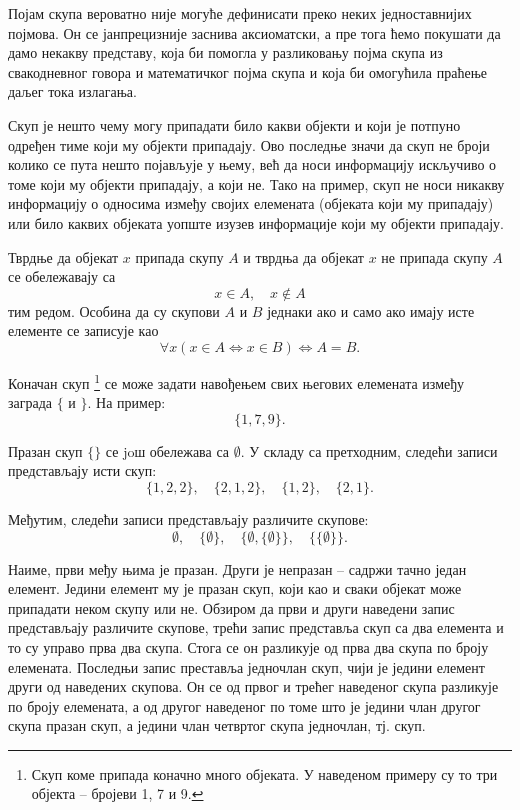 \documentclass[a4paper]{book}
\newcommand{\tj}{\mbox{тј.} }
\begin{document}
\indent

Појам скупа вероватно није могуће дефинисати преко неких једноставнијих појмова. Он се јанпрецизније
заснива аксиоматски, а пре тога ћемо покушати да дамо некакву представу, која би помогла у разликовању
појма скупа из свакодневног говора и математичког појма скупа и која би омогућила праћење даљег тока
излагања.

Скуп је нешто чему могу припадати било какви објекти и који је потпуно одређен тиме који му објекти
припадају. Ово последње значи да скуп не броји колико се пута нешто појављује у њему, већ да
носи информацију искључиво о томе који му објекти припадају, а који не. Тако на пример, скуп не носи никакву
информацију о односима између својих елемената (објеката који му припадају) или било каквих објеката уопште
изузев информације који му објекти припадају.

Тврдње да објекат $x$ припада скупу $A$ и тврдња да објекат $x$ не припада скупу $A$ се обележавају са
$$
x\in A,\quad x\not\in A
$$
тим редом. Особина да су скупови $A$ и $B$ једнаки ако и само ако имају исте елементе се записује као
\begin{equation}
\label{ekstenzionalnost}
\forall x(x\in A\Leftrightarrow x\in B)\Leftrightarrow A=B.
\end{equation}

Коначан скуп%
\footnote{Скуп коме припада коначно много објеката. У наведеном примеру су то три објекта -- бројеви 1, 7 и 9.}
се може задати навођењем свих његових елемената између заграда $\{$ и $\}$. На пример:
$$
\{1,7,9\}.
$$

Празан скуп $\{\}$ се joш обележава са $\emptyset$. У складу са претходним, следећи записи предста\-вља\-ју исти скуп:
$$
\{1,2,2\},\quad\{2,1,2\},\quad\{1,2\},\quad\{2,1\}.
$$

Међутим, следећи записи представљају различите скупове:
$$
\emptyset,\quad\{\emptyset\},\quad\{\emptyset,\{\emptyset\}\},\quad\{\{\emptyset\}\}.
$$

Наиме, први међу њима је празан. Други је непразан -- садржи тачно један елемент. Једини елемент му је празан скуп,
који као и сваки објекат може припадати неком скупу или не. Обзиром да први и други наведени запис представљају
различите скупове, трећи запис представља скуп са два елемента и то су управо прва два скупа. Стога се он разликује
од прва два скупа по броју елемената. Последњи запис преставља једночлан скуп, чији је једини елемент други од
наведених скупова. Он се од првог и трећег наведеног скупа разликује по броју елемената, а од другог наведеног
по томе што је једини члан другог скупа празан скуп, а једини члан четвртог скупа једночлан, \tj{} скуп.
\end{document}
